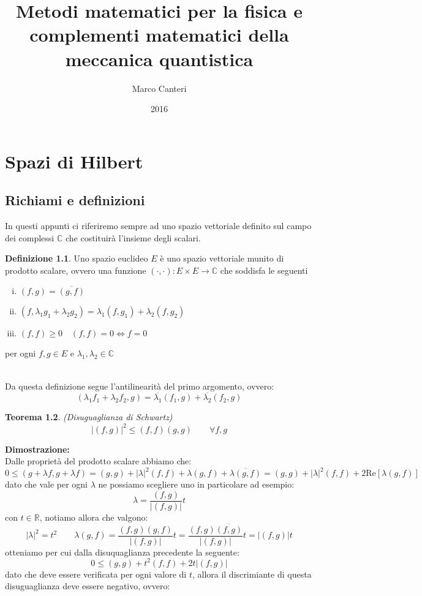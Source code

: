 \documentclass[12pt]{book}
\title{\textbf{Metodi matematici per la fisica e complementi matematici della meccanica quantistica}}
\author{Marco Canteri}
\date{2016}
\theoremstyle{plain}
\newcommand{\R}{\mathbb{R}}
\newcommand{\C}{\mathbb{C}}
\newtheorem{thm}{Teorema}[section]
\theoremstyle{definition}
\newtheorem{dfn}[thm]{Definizione}
\theoremstyle{remark}
\begin{document}
\pagestyle{empty} 
\titleGP
\newpage

\tableofcontents
\pagestyle{fancy}

\chapter{Spazi di Hilbert}
\section{Richiami e definizioni}
In questi appunti ci riferiremo sempre ad uno spazio vettoriale definito sul campo dei complessi $\C$ che costituirà l'insieme degli scalari.
\begin{dfn}
Uno spazio euclideo $E$ è uno spazio vettoriale munito di prodotto scalare, ovvero una funzione $(\cdot,\cdot):E\times E\to \C$ che soddisfa le seguenti
\begin{enumerate}[i.]
\item $(f,g) = \overline{(g,f)}$
\item $(f,\lambda_1g_1+\lambda_2g_2) = \lambda_1(f,g_1) + \lambda_2(f,g_2)$
\item $(f,f)\geq 0 \quad (f,f)=0\iff f=0$
\end{enumerate}
per ogni $f,g\in E$ e $\lambda_1,\lambda_2\in \C$
\end{dfn}
\leavevmode
\\Da questa definizione segue l'antilinearità del primo argomento, ovvero:
\[(\lambda_1f_1+\lambda_2f_2,g) = \overline{\lambda_1}(f_1,g) + \overline{\lambda_2}(f_2,g)\]
\begin{thm}(Disuguaglianza di Schwartz)
\begin{equation}
|(f,g)|^2 \leq (f,f)(g,g) \qquad \forall f,g
\end{equation}
\end{thm}
\hspace{-1.6em}\textbf{Dimostrazione:}\\
Dalle proprietà del prodotto scalare abbiamo che:
\[0\leq (g+\lambda f,g+\lambda f) = (g,g) + |\lambda|^2(f,f) + \lambda(g,f) + \overline{\lambda(g,f)} = (g,g) + |\lambda|^2(f,f) + 2\text{Re}[\lambda(g,f)]\]
dato che vale per ogni $\lambda$ ne possiamo scegliere uno in particolare ad esempio:
\[\lambda = \frac{(f,g)}{|(f,g)|}t\]
con $t\in \R$, notiamo allora che valgono:
\[|\lambda|^2 = t^2\qquad \lambda (g,f) = \frac{(f,g)(g,f)}{|(f,g)|}t = \frac{(f,g)\overline{(f,g)}}{|(f,g)|}t = |(f,g)|t\]
otteniamo per cui dalla disuquaglianza precedente la seguente:
\[0\leq (g,g) + t^2(f,f) + 2t|(f,g)|\]
dato che deve essere verificata per ogni valore di $t$, allora il discrimiante di questa disuguaglianza deve essere negativo, ovvero:
\end{document}
